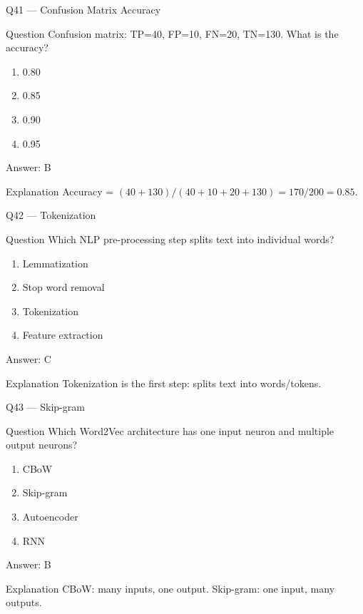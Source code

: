 \documentclass[aspectratio=169,8pt]{beamer}
\begin{document}
	\begin{frame}{Q41 --- Confusion Matrix Accuracy}
		\begin{block}{Question}
			Confusion matrix: TP=40, FP=10, FN=20, TN=130. What is the accuracy?
		\end{block}
		\begin{enumerate}
			\item 0.80
			\item 0.85
			\item 0.90
			\item 0.95
		\end{enumerate}
		\begin{exampleblock}{Answer: B}\end{exampleblock}
		\begin{block}{Explanation}
			Accuracy = $(40+130)/(40+10+20+130) = 170/200 = 0.85$.
		\end{block}
	\end{frame}
	
	\begin{frame}{Q42 --- Tokenization}
		\begin{block}{Question}
			Which NLP pre-processing step splits text into individual words?
		\end{block}
		\begin{enumerate}
			\item Lemmatization
			\item Stop word removal
			\item Tokenization
			\item Feature extraction
		\end{enumerate}
		\begin{exampleblock}{Answer: C}\end{exampleblock}
		\begin{block}{Explanation}
			Tokenization is the first step: splits text into words/tokens.
		\end{block}
	\end{frame}
	
	\begin{frame}{Q43 --- Skip-gram}
		\begin{block}{Question}
			Which Word2Vec architecture has one input neuron and multiple output neurons?
		\end{block}
		\begin{enumerate}
			\item CBoW
			\item Skip-gram
			\item Autoencoder
			\item RNN
		\end{enumerate}
		\begin{exampleblock}{Answer: B}\end{exampleblock}
		\begin{block}{Explanation}
			CBoW: many inputs, one output. Skip-gram: one input, many outputs.
		\end{block}
	\end{frame}
	
\end{document}
